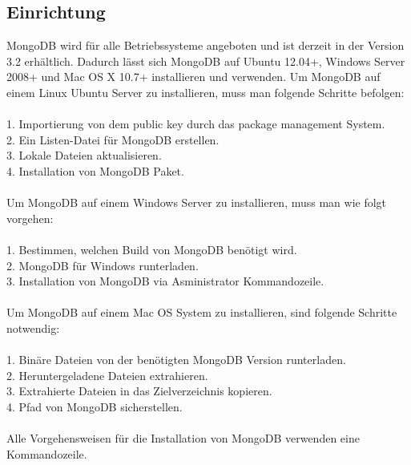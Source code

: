 \subsection{Einrichtung}
MongoDB wird für alle Betriebssysteme angeboten und ist derzeit in der Version 3.2 erhältlich. Dadurch lässt sich MongoDB auf Ubuntu 12.04+, Windows Server 2008+ und Mac OS X 10.7+ installieren und verwenden. 
Um MongoDB auf einem Linux Ubuntu Server zu installieren, muss man folgende Schritte befolgen:
\\
\\
1. Importierung von dem public key durch das package management System.
\\
2. Ein Listen-Datei für MongoDB erstellen.
\\
3. Lokale Dateien aktualisieren.
\\
4. Installation von MongoDB Paket.
\\
\\
Um MongoDB auf einem Windows Server zu installieren, muss man wie folgt vorgehen:
\\
\\
1. Bestimmen, welchen Build von MongoDB benötigt wird.
\\
2. MongoDB für Windows runterladen.
\\
3. Installation von MongoDB via Asministrator Kommandozeile.
\\
\\
Um MongoDB auf einem Mac OS System zu installieren, sind folgende Schritte notwendig:
\\
\\
1. Binäre Dateien von der benötigten MongoDB Version runterladen.
\\
2. Heruntergeladene Dateien extrahieren.
\\
3. Extrahierte Dateien in das Zielverzeichnis kopieren.
\\
4. Pfad von MongoDB sicherstellen.
\\
\\
Alle Vorgehensweisen für die Installation von MongoDB verwenden eine Kommandozeile.
